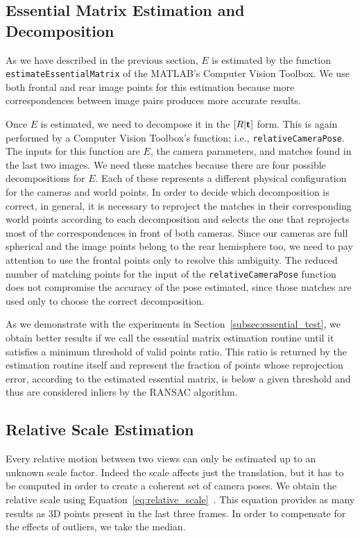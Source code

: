 \subsection{Essential Matrix Estimation and Decomposition}\label{subsec:essential_estimation}
As we have described in the previous section, $E$ is estimated 
by the function {\tt estimateEssentialMatrix} of the MATLAB's 
Computer Vision Toolbox.
We use both frontal and rear image points for this estimation because
more correspondences between image pairs produces more accurate results.

Once $E$ is estimated, we need to decompose it in the 
\( [R|\mathbf{t} ] \) form. This is again performed by a Computer Vision 
Toolbox's function; i.e., {\tt relativeCameraPose}.
The inputs for this function are $E$, the camera parameters, and matches found in the last two images.
We need these matches because there are four possible decompositions for $E$. Each of these represents a different physical configuration for the cameras and world points.
In order to decide which decomposition is correct, in general, it is necessary to reproject the matches in their corresponding world points according to each 
decomposition and selects the one that reprojects most of the correspondences in 
front of both cameras.
Since our cameras are full spherical and the image points belong to the 
rear hemisphere too, we need to pay attention to use the frontal points only to resolve this ambiguity. 
The reduced number of matching points for the input of the 
{\tt relativeCameraPose} function does not compromise the accuracy of the pose 
estimated, since those matches are used only to choose the 
correct decomposition.

As we demonstrate with the experiments in Section~\ref{subsec:essential_test}, we obtain better
results if we call the essential matrix estimation routine until it satisfies
a minimum threshold of valid points ratio. This ratio is returned by the
estimation routine itself and represent the fraction of points whose
reprojection error, according to the estimated essential matrix,
is below a given threshold and thus are
considered inliers by the RANSAC algorithm.

\subsection{Relative Scale Estimation}
Every relative motion between two views can only be estimated up to an unknown 
scale factor. Indeed the scale affects just the translation, but it has to 
be computed in order to create a coherent set of camera poses.
We obtain the relative scale using 
Equation~\ref{eq:relative_scale}~\cite{scaramuzzaVisualOdometryI}.
This equation provides as many results as 3D points present in the last three
frames. In order to compensate for the effects of outliers, we take the 
median.

